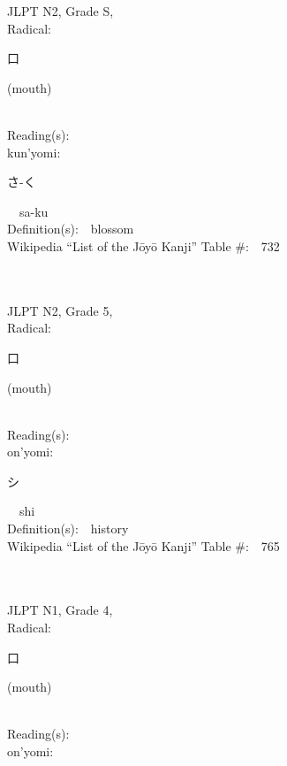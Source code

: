 \begin{multicols}{2}
{JLPT N2, Grade S, \\Radical:\ \ {\begin{CJK}{UTF8}{min} 口 \end{CJK}} (mouth) } \\
Reading(s):\ \ \\
{\hspace*{1em}}kun'yomi:\ \ \\
{\hspace*{2em}}{\begin{CJK}{UTF8}{min} さ-く \end{CJK}}\ \ sa-ku\ \ \\
Definition(s):\ \ blossom \\
Wikipedia ``List of the J\=oy\=o Kanji'' Table \#:\ \ 732 \\
\ \ \\
{\fontsize{34pt}{40pt}  }\ \ \\  %
{JLPT N2, Grade 5, \\Radical:\ \ {\begin{CJK}{UTF8}{min} 口 \end{CJK}} (mouth) } \\
Reading(s):\ \ \\
{\hspace*{1em}}on'yomi:\ \ \\
{\hspace*{2em}}{\begin{CJK}{UTF8}{min} シ \end{CJK}}\ \ shi\ \ \\
Definition(s):\ \ history \\
Wikipedia ``List of the J\=oy\=o Kanji'' Table \#:\ \ 765 \\
\ \ \\
{\fontsize{34pt}{40pt}  }\ \ \\  %
{JLPT N1, Grade 4, \\Radical:\ \ {\begin{CJK}{UTF8}{min} 口 \end{CJK}} (mouth) } \\
Reading(s):\ \ \\
{\hspace*{1em}}on'yomi:\ \ \\

\end{multicols}
